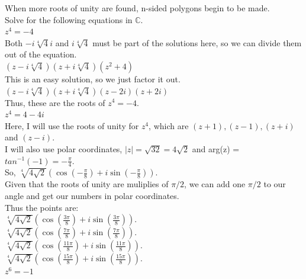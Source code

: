 \documentclass[12pt]{article}
\begin{document}
When more roots of unity are found, n-sided polygons begin to be made.\\

Solve for the following equations in $\mathbb{C}$.\\


 $z^4 = -4$ \\

Both $-i\sqrt[4]{4}i$ and $i\sqrt[4]{4}$ must be part of the solutions here, so we can divide them out of the equation.\\


$(z-i\sqrt[4]{4})(z+i\sqrt[4]{4})(z^2 + 4)$\\
This is an easy solution, so we just factor it out.\\

$(z-i\sqrt[4]{4})(z+i\sqrt[4]{4})(z-2i)(z+2i)$\\

Thus, these are the roots of $z^4 = -4$.\\


 $z^4 = 4 - 4i$\\

Here, I will use the roots of unity for $z^4$, which are $(z+1), (z-1), (z+i)$ and $(z-i)$.\\

I will also use polar coordinates, $|z| = \sqrt{32} = 4\sqrt{2}$ and arg(z) = $tan^{-1}(-1) = -\frac{\pi}{4}$.\\
So, $\sqrt[4]{4\sqrt{2}}(\cos(-\frac{\pi}{8}) + i\sin(-\frac{\pi}{8}))$.\\

Given that the roots of unity are muliplies of $\pi/2$, we can add one $\pi/2$ to our angle and get our numbers in polar coordinates.\\

Thus the points are:\\

$\sqrt[4]{4\sqrt{2}}(\cos(\frac{3\pi}{8}) + i\sin(\frac{3\pi}{8}))$.\\
$\sqrt[4]{4\sqrt{2}}(\cos(\frac{7\pi}{8}) + i\sin(\frac{7\pi}{8}))$.\\
$\sqrt[4]{4\sqrt{2}}(\cos(\frac{11\pi}{8}) + i\sin(\frac{11\pi}{8}))$.\\
$\sqrt[4]{4\sqrt{2}}(\cos(\frac{15\pi}{8}) + i\sin(\frac{15\pi}{8}))$.\\


 $z^6 = -1$\\
\end{document}
